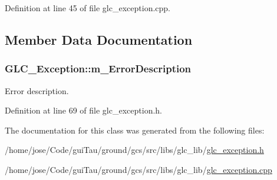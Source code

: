 Definition at line 45 of file glc\-\_\-exception.\-cpp.



\subsection{Member Data Documentation}
\hypertarget{class_g_l_c___exception_ad6dfcf8c7d5360c0f885e522f2661632}{
\subsubsection[{m\-\_\-\-Error\-Description}]{ G\-L\-C\-\_\-\-Exception\-::m\-\_\-\-Error\-Description\hspace{0.3cm}{\ttfamily [protected]}}}\label{class_g_l_c___exception_ad6dfcf8c7d5360c0f885e522f2661632}


Error description. 



Definition at line 69 of file glc\-\_\-exception.\-h.



The documentation for this class was generated from the following files\-:\begin{DoxyCompactItemize}
\item 
/home/jose/\-Code/gui\-Tau/ground/gcs/src/libs/glc\-\_\-lib/\hyperlink{glc__exception_8h}{glc\-\_\-exception.\-h}\item 
/home/jose/\-Code/gui\-Tau/ground/gcs/src/libs/glc\-\_\-lib/\hyperlink{glc__exception_8cpp}{glc\-\_\-exception.\-cpp}\end{DoxyCompactItemize}
